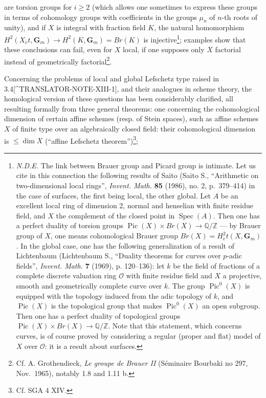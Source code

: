 \documentclass[
  11pt,
  a4paper,
]{book}
\begin{document}
are torsion groups for \(i \geqslant 2\) (which allows one sometimes to
express these groups in terms of cohomology groups with coefficients in
the groups \(\mu_{n}\) of \(n\)-th roots of unity), and if \(X\) is
integral with fraction field \(K\), the natural homomorphism
\(H^{2}(X_{\acute{e}}t, \mathbf{G}_{m}) \to H^{2}(K, \mathbf{G}_{m}) = Br(K)\)
is injective\footnote{\emph{N.D.E.} The link between Brauer group and
  Picard group is intimate. Let us cite in this connection the following
  results of Saito (Saito S., ``Arithmetic on two-dimensional local
  rings'', \emph{Invent. Math.} \textbf{85} (1986), no. 2, p.~379--414)
  in the case of surfaces, the first being local, the other global. Let
  \(A\) be an excellent local ring of dimension 2, normal and henselian
  with finite residue field, and \(X\) the complement of the closed
  point in \(\operatorname{Spec}(A)\). Then one has a perfect duality of
  torsion groups \(\operatorname{Pic}(X) \times
  Br(X) \to \mathbb{Q}/\mathbb{Z}\) --- by Brauer group of \(X\), one
  means cohomological Brauer group \(Br(X) =
  H^{2}_{\acute{e}}t(X, \mathbf{G}_{m})\). In the global case, one has
  the following generalization of a result of Lichtenbaum (Lichtenbaum
  S., ``Duality theorems for curves over \(p\)-adic fields'',
  \emph{Invent. Math.} \textbf{7} (1969), p. 120--136): let \(k\) be the
  field of fractions of a complete discrete valuation ring
  \(\mathcal{O}\) with finite residue field and \(X\) a projective,
  smooth and geometrically complete curve over \(k\). The group
  \(\operatorname{Pic}^{0}(X)\) is equipped with the topology induced
  from the adic topology of \(k\), and \(\operatorname{Pic}(X)\) is the
  topological group that makes \(\operatorname{Pic}^{0}(X)\) an open
  subgroup. Then one has a perfect duality of topological groups
  \(\operatorname{Pic}(X) \times Br(X) \to \mathbb{Q}/\mathbb{Z}\). Note
  that this statement, which concerns curves, is of course proved by
  considering a regular (proper and flat) model of \(X\) over
  \(\mathcal{O}\): it is a result about surfaces.}; examples show that
these conclusions can fail, even for \(X\) local, if one supposes only
\(X\) factorial instead of geometrically factorial\footnote{Cf. A.
  Grothendieck, \emph{Le groupe de Brauer II} (Séminaire Bourbaki no
  297, Nov.~1965), notably 1.8 and 1.11 b.}.

Concerning the problems of local and global Lefschetz type raised in
3.4{[}\^{}TRANSLATOR-NOTE-XIII-1{]}, and their analogues in scheme
theory, the homological version of these questions has been considerably
clarified, all resulting formally from three general theorems: one
concerning the cohomological dimension of certain affine schemes (resp.
of Stein spaces), such as affine schemes \(X\) of finite type over an
algebraically closed field: their cohomological dimension is
\(\leqslant \dim X\) (``affine Lefschetz theorem'')\footnote{Cf. SGA 4
  XIV.};
\end{document}
